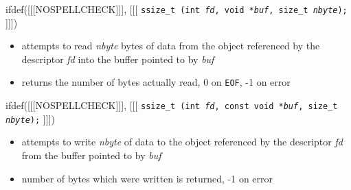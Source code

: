 

\begin{slide}

ifdef([[[NOSPELLCHECK]]], [[[
\texttt{ssize\_t (int \emph{fd}, void *\emph{buf},
size\_t \emph{nbyte});}
]]])
\begin{itemize}
\item attempts to read \emph{nbyte} bytes of data from the object referenced by
the descriptor \emph{fd} into the buffer pointed to by \emph{buf}
\item returns the number of bytes actually read, 0 on \texttt{EOF}, -1 on error
\end{itemize}

ifdef([[[NOSPELLCHECK]]], [[[
\texttt{ssize\_t (int \emph{fd}, const void *\emph{buf},
size\_t \emph{nbyte});}
]]])
\begin{itemize}
\item attempts to write \emph{nbyte} of data to the object referenced by the
descriptor \emph{fd} from the buffer pointed to by \emph{buf}
\item number of bytes which were written is returned, -1 on error
\end{itemize}
\end{slide}


